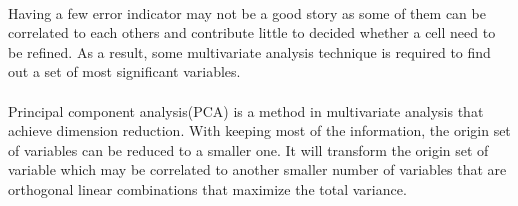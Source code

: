 \paragraph{}
Having a few error indicator may not be a good story as some of them can be correlated to each others and contribute little to decided whether a cell need to be refined.
As a result, some multivariate analysis technique is required to find out a set of most significant variables.

\paragraph{}
Principal component analysis(PCA) is a method in multivariate analysis that achieve dimension reduction.
With keeping most of the information, the origin set of variables can be reduced to a smaller one.
It will transform the origin set of variable which may be correlated to another smaller number of variables that are orthogonal linear combinations that maximize the total variance.


